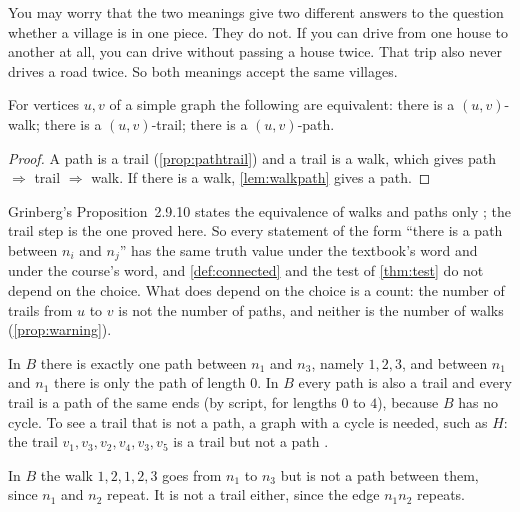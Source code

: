 \plainwords You may worry that the two meanings give two different answers to the question whether a village is in one piece.
They do not.
If you can drive from one house to another at all, you can drive without passing a house twice.
That trip also never drives a road twice.
So both meanings accept the same villages.

\begin{proposition}\label{prop:readings}
For vertices $u,v$ of a simple graph the following are equivalent: there is a $(u,v)$-walk; there is a $(u,v)$-trail; there is a $(u,v)$-path.
\end{proposition}

\begin{proof}
A path is a trail (\cref{prop:pathtrail}) and a trail is a walk, which gives path $\Rightarrow$ trail $\Rightarrow$ walk.
If there is a walk, \cref{lem:walkpath} gives a path.
\end{proof}

Grinberg's Proposition~2.9.10 states the equivalence of walks and paths only \cite{grinberg2025graph}; the trail step is the one proved here.
So every statement of the form ``there is a path between $n_i$ and $n_j$'' has the same truth value under the textbook's word and under the course's word, and \cref{def:connected} and the test of \cref{thm:test} do not depend on the choice.
What does depend on the choice is a count: the number of trails from $u$ to $v$ is not the number of paths, and neither is the number of walks (\cref{prop:warning}).

\begin{example}
In $B$ there is exactly one path between $n_1$ and $n_3$, namely $1,2,3$, and between $n_1$ and $n_1$ there is only the path of length $0$.
In $B$ every path is also a trail and every trail is a path of the same ends (by script, for lengths $0$ to $4$), because $B$ has no cycle.
To see a trail that is not a path, a graph with a cycle is needed, such as $H$: the trail $v_1,v_3,v_2,v_4,v_3,v_5$ is a trail but not a path \cite[p.~22]{petrosyan2015grafneri}.
\end{example}

\begin{nonexample}
In $B$ the walk $1,2,1,2,3$ goes from $n_1$ to $n_3$ but is not a path between them, since $n_1$ and $n_2$ repeat.
It is not a trail either, since the edge $n_1n_2$ repeats.
\end{nonexample}
